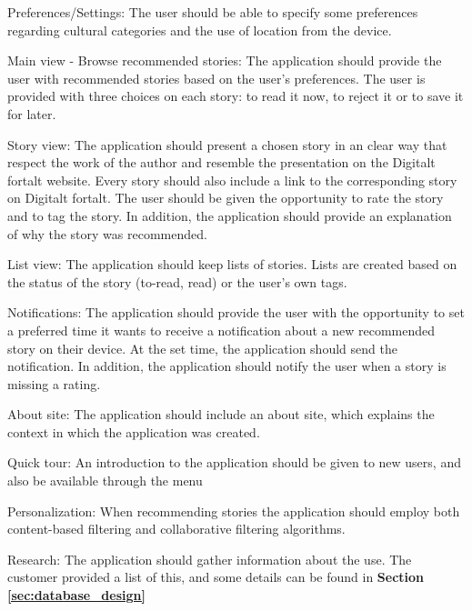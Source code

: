 Preferences/Settings: The user should be able to specify some preferences regarding cultural categories and the use of location from the device.\newline

Main view - Browse recommended stories: The application should provide the user with recommended stories based on the user’s preferences. The user is provided with three choices on each story: to read it now, to reject it or to save it for later.\newline

Story view: The application should present a chosen story in an clear way that respect the work of the author and resemble the presentation on the Digitalt fortalt website. Every story should also include a link to the corresponding story on Digitalt fortalt. The user should be given the opportunity to rate the story and to tag the story. In addition, the application should provide an explanation of why the story was recommended.\newline

List view: The application should keep lists of stories. Lists are created based on the status of the story (to-read, read) or the user's own tags.\newline

Notifications: The application should provide the user with the opportunity to set a preferred time it wants to receive a notification about a new recommended story on their device. At the set time, the application should send the notification. In addition, the application should notify the user when a story is missing a rating.\newline

About site: The application should include an about site, which explains the context in which the application was created. \newline

Quick tour: An introduction to the application should be given to new users, and also be available through the menu \newline  

Personalization: When recommending stories the application should employ both content-based filtering and collaborative filtering algorithms.\newline

Research: The application should gather information about the use. The customer provided a list of this, and some details can be found in \textbf{Section \ref{sec:database_design}} \newline

